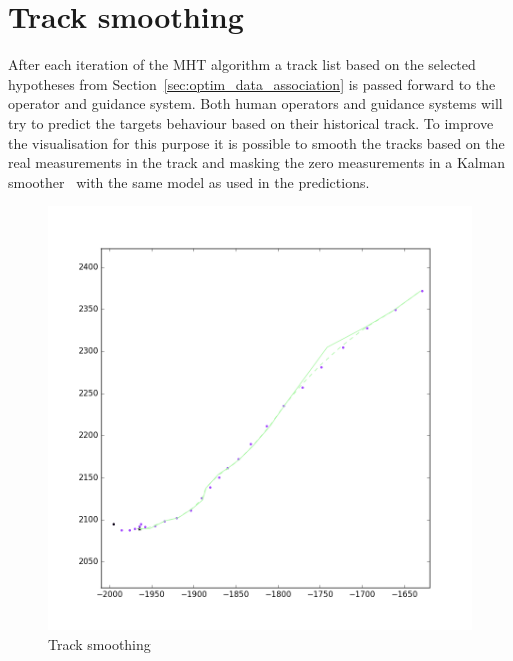 \section{Track smoothing}
After each iteration of the MHT algorithm a track list based on the selected hypotheses from Section~\ref{sec:optim_data_association} is passed forward to the operator and guidance system. Both human operators and guidance systems will try to predict the targets behaviour based on their historical track. To improve the visualisation for this purpose it is possible to smooth the tracks based on the real measurements in the track and masking the zero measurements in a Kalman smoother~\cite{Brown2012} with the same model as used in the predictions.
\begin{figure}
\centering
\includegraphics[width = .9\textwidth]{Figures/track_smoothing.png}
\caption{Track smoothing}\label{fig:track_smoothing}
\end{figure}
